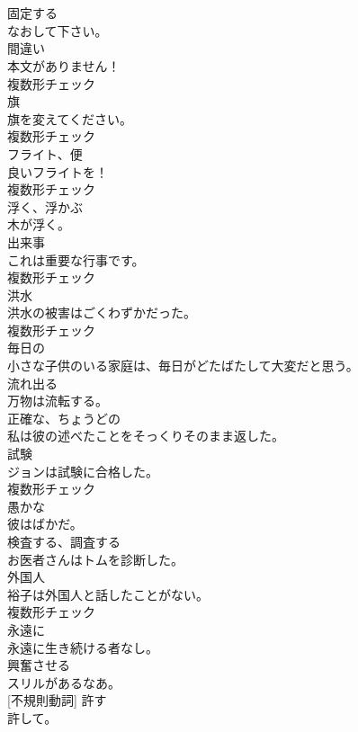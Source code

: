 \documentclass[8pt]{extreport}
\begin{document}
\begin{CJK}{UTF8}{min}
\\	[動詞]	
\\	固定する	
\\	なおして下さい。	
\\	[名詞]	間違い	
\\	本文がありません！	
\\	複数形チェック
\\	[名詞]	旗	
\\	旗を変えてください。	
\\	複数形チェック
\\	[名詞]	フライト、便	
\\	良いフライトを！	
\\	複数形チェック
\\	[動詞]	浮く、浮かぶ	
\\	木が浮く。	
\\	[名詞]	出来事	
\\	これは重要な行事です。	
\\	複数形チェック
\\	[名詞]	洪水	
\\	洪水の被害はごくわずかだった。	
\\	複数形チェック
\\	[形容詞]	毎日の	
\\	小さな子供のいる家庭は、毎日がどたばたして大変だと思う。	
\\	[動詞]	流れ出る	
\\	万物は流転する。	
\\	[形容詞]	正確な、ちょうどの	
\\	私は彼の述べたことをそっくりそのまま返した。	
\\	[名詞]	試験	
\\	ジョンは試験に合格した。	
\\	複数形チェック
\\	[形容詞]	愚かな	
\\	彼はばかだ。	
\\	[動詞]	検査する、調査する	
\\	お医者さんはトムを診断した。	
\\	[名詞]	外国人	
\\	裕子は外国人と話したことがない。	
\\	複数形チェック
\\	[副詞]	永遠に	
\\	永遠に生き続ける者なし。	
\\	[形容詞]	興奮させる	
\\	スリルがあるなあ。	
\\	[動詞] [不規則動詞]	許す	
\\	許して。	

\end{CJK}
\end{document}
